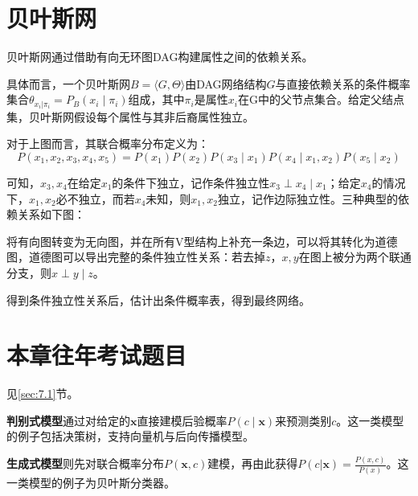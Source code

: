 \section{贝叶斯网}\label{sec:7.4}
贝叶斯网通过借助有向无环图DAG构建属性之间的依赖关系。

具体而言，一个贝叶斯网$B=\langle G, \Theta\rangle$由DAG网络结构$G$与直接依赖关系的条件概率集合$\theta_{x_i|\pi_i} = P_B(x_i\mid \pi_i)$组成，其中$\pi_i$是属性$x_i$在G中的父节点集合。给定父结点集，贝叶斯网假设每个属性与其非后裔属性独立。

\begin{figure}[!htbp]
	\centering
\end{figure}

对于上图而言，其联合概率分布定义为：
\[
P\left(x_{1}, x_{2}, x_{3}, x_{4}, x_{5}\right)=P\left(x_{1}\right) P\left(x_{2}\right) P\left(x_{3} \mid x_{1}\right) P\left(x_{4} \mid x_{1}, x_{2}\right) P\left(x_{5} \mid x_{2}\right)
\]

可知，$x_3,x_4$在给定$x_1$的条件下独立，记作条件独立性$x_{3} \perp x_{4} \mid x_{1}$；给定$x_4$的情况下，$x_1,x_2$必不独立，而若$x_4$未知，则$x_1,x_2$独立，记作边际独立性。三种典型的依赖关系如下图：

\begin{figure}[!htbp]
	\centering
\end{figure}

将有向图转变为无向图，并在所有V型结构上补充一条边，可以将其转化为道德图，道德图可以导出完整的条件独立性关系：若去掉$z$，$x,y$在图上被分为两个联通分支，则$x \perp y \mid z$。

得到条件独立性关系后，估计出条件概率表，得到最终网络。

\section{本章往年考试题目}\label{sec:7.5}

见\ref{sec:7.1}节。


\textbf{判别式模型}通过对给定的$\boldsymbol x$直接建模后验概率$P(c\mid \boldsymbol x)$来预测类别$c$。这一类模型的例子包括决策树，支持向量机与后向传播模型。

\textbf{生成式模型}则先对联合概率分布$P(\boldsymbol x, c)$建模，再由此获得$P(c|\boldsymbol x) = \frac{P(x,c)}{P(x)}$。这一类模型的例子为贝叶斯分类器。